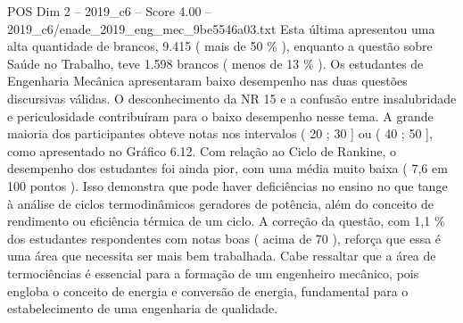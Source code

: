 \begin{textsample}{POS Dim 2 – 2019\_c6 – Score 4.00 – 2019\_c6/enade\_2019\_eng\_mec\_9be5546a03.txt}
Esta última apresentou uma alta quantidade de brancos, 9.415 ( mais de 50 \% ), enquanto a questão sobre Saúde no Trabalho, teve 1.598 brancos ( menos de 13 \% ).
Os estudantes de Engenharia Mecânica apresentaram baixo desempenho nas duas questões discursivas válidas.
O desconhecimento da NR 15 e a confusão entre insalubridade e periculosidade contribuíram para o baixo desempenho nesse tema.
A grande maioria dos participantes obteve notas nos intervalos ( 20 ; 30 ] ou ( 40 ; 50 ], como apresentado no Gráfico 6.12.
Com relação ao Ciclo de Rankine, o desempenho dos estudantes foi ainda pior, com uma média muito baixa ( 7,6 em 100 pontos ).
Isso demonstra que pode haver deficiências no ensino no que tange à análise de ciclos termodinâmicos geradores de potência, além do conceito de rendimento ou eficiência térmica de um ciclo.
A correção da questão, com 1,1 \% dos estudantes respondentes com notas boas ( acima de 70 ), reforça que essa é uma área que necessita ser mais bem trabalhada.
Cabe ressaltar que a área de termociências é essencial para a formação de um engenheiro mecânico, pois engloba o conceito de energia e conversão de energia, fundamental para o estabelecimento de uma engenharia de qualidade.

\end{textsample}
